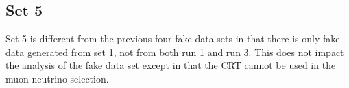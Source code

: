 \subsection{Set 5}

Set 5 is different from the previous four fake data sets in that there is only fake data generated from set 1, not from both run 1 and run 3.  This does not impact the analysis of the fake data set except in that the CRT cannot be used in the muon neutrino selection. 

